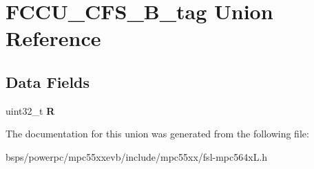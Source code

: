 \hypertarget{unionFCCU__CFS__32B__tag}{}\section{F\+C\+C\+U\+\_\+\+C\+F\+S\+\_\+B\+\_\+tag Union Reference}
\label{unionFCCU__CFS__32B__tag}
\subsection*{Data Fields}
\begin{DoxyCompactItemize}
\item 
\mbox{\label{unionFCCU__CFS__32B__tag_a8fefb087c9dfbc2bbafd2e62e5b60650}} 
uint32\+\_\+t {\bfseries R}
\end{DoxyCompactItemize}


The documentation for this union was generated from the following file\+:\begin{DoxyCompactItemize}
\item 
bsps/powerpc/mpc55xxevb/include/mpc55xx/fsl-\/mpc564x\+L.\+h\end{DoxyCompactItemize}
